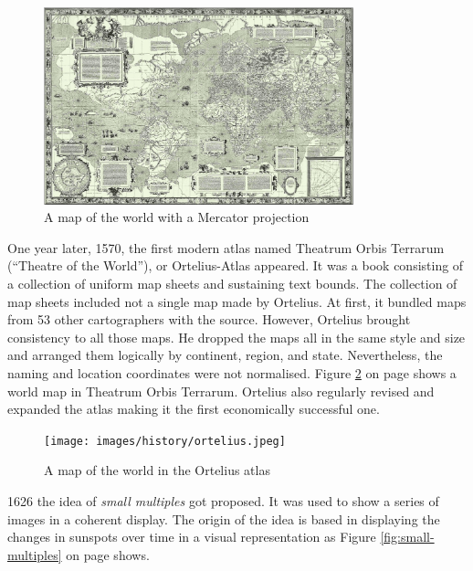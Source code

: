 \begin{figure}[!htb]
\centering
\includegraphics[width=0.8\textwidth,keepaspectratio]{images/history/mercator.png}
\caption[
    A map of the world with a Mercator projection, Urldate: 07.2016 \newline
\small\texttt{\url{https://upload.wikimedia.org/wikipedia/commons/b/b2/Mercator_1569.png}}
]{A map of the world with a Mercator projection}
\label{fig:mercator}
\end{figure}

One year later, 1570, the first modern atlas named Theatrum Orbis Terrarum (``Theatre of the World''), or Ortelius-Atlas appeared. It was a book consisting of a collection of uniform map sheets and sustaining text bounds. The collection of map sheets included not a single map made by Ortelius. At first, it bundled maps from 53 other cartographers with the source. However, Ortelius brought consistency to all those maps. He dropped the maps all in the same style and size and arranged them logically by continent, region, and state. Nevertheless, the naming and location coordinates were not normalised. Figure \ref{fig:ortelius} on page \pageref{fig:ortelius} shows a world map in Theatrum Orbis Terrarum. Ortelius also regularly revised and expanded the atlas making it the first economically successful one.

\begin{figure}[!htb]
\centering
\texttt{[image: images/history/ortelius.jpeg]}
\caption[
    A map of the world in the Ortelius atlas, Urldate: 07.2016 \newline
\small\texttt{\url{https://upload.wikimedia.org/wikipedia/commons/6/6f/OrteliusWorldMap.jpeg}}
]{A map of the world in the Ortelius atlas}
\label{fig:ortelius}
\end{figure}

1626 the idea of \textit{small multiples} got proposed. It was used to show a series of images in a coherent display. The origin of the idea is based in displaying the changes in sunspots over time in a visual representation as Figure \ref{fig:small-multiples} on page \pageref{fig:small-multiples} shows.


